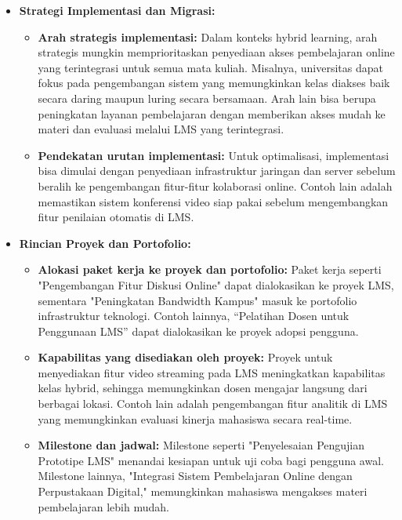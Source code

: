 \begin{itemize}
	\item \textbf{Strategi Implementasi dan Migrasi:}
	
	\begin{itemize}
		\item \textbf{Arah strategis implementasi:} Dalam konteks hybrid learning, arah strategis mungkin memprioritaskan penyediaan akses pembelajaran online yang terintegrasi untuk semua mata kuliah. Misalnya, universitas dapat fokus pada pengembangan sistem yang memungkinkan kelas diakses baik secara daring maupun luring secara bersamaan. Arah lain bisa berupa peningkatan layanan pembelajaran dengan memberikan akses mudah ke materi dan evaluasi melalui LMS yang terintegrasi.
		
		\item \textbf{Pendekatan urutan implementasi:} Untuk optimalisasi, implementasi bisa dimulai dengan penyediaan infrastruktur jaringan dan server sebelum beralih ke pengembangan fitur-fitur kolaborasi online. Contoh lain adalah memastikan sistem konferensi video siap pakai sebelum mengembangkan fitur penilaian otomatis di LMS.
	\end{itemize}
	
	\item \textbf{Rincian Proyek dan Portofolio:}
	
	\begin{itemize}
		\item \textbf{Alokasi paket kerja ke proyek dan portofolio:} Paket kerja seperti "Pengembangan Fitur Diskusi Online" dapat dialokasikan ke proyek LMS, sementara "Peningkatan Bandwidth Kampus" masuk ke portofolio infrastruktur teknologi. Contoh lainnya, “Pelatihan Dosen untuk Penggunaan LMS” dapat dialokasikan ke proyek adopsi pengguna.
		
		\item \textbf{Kapabilitas yang disediakan oleh proyek:} Proyek untuk menyediakan fitur video streaming pada LMS meningkatkan kapabilitas kelas hybrid, sehingga memungkinkan dosen mengajar langsung dari berbagai lokasi. Contoh lain adalah pengembangan fitur analitik di LMS yang memungkinkan evaluasi kinerja mahasiswa secara real-time.
		
		\item \textbf{Milestone dan jadwal:} Milestone seperti "Penyelesaian Pengujian Prototipe LMS" menandai kesiapan untuk uji coba bagi pengguna awal. Milestone lainnya, "Integrasi Sistem Pembelajaran Online dengan Perpustakaan Digital," memungkinkan mahasiswa mengakses materi pembelajaran lebih mudah.
		

\end{itemize}
\end{itemize}
